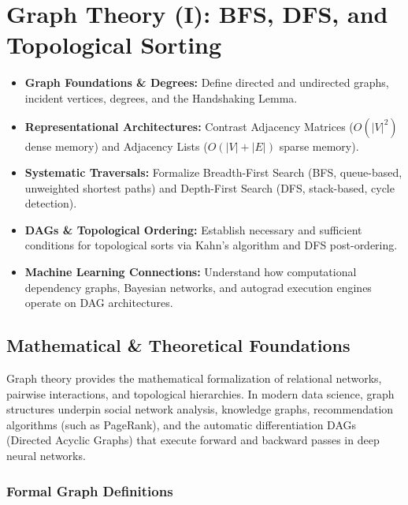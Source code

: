 \chapter{Graph Theory (I): BFS, DFS, and Topological Sorting}

\begin{tcolorbox}[colback=primarylight, colframe=primarydark, title={\textbf{Executive Roadmap \& Learning Objectives}}]
\begin{itemize}
    \item \textbf{Graph Foundations \& Degrees:} Define directed and undirected graphs, incident vertices, degrees, and the Handshaking Lemma.
    \item \textbf{Representational Architectures:} Contrast Adjacency Matrices ($O(|V|^2)$ dense memory) and Adjacency Lists ($O(|V| + |E|)$ sparse memory).
    \item \textbf{Systematic Traversals:} Formalize Breadth-First Search (BFS, queue-based, unweighted shortest paths) and Depth-First Search (DFS, stack-based, cycle detection).
    \item \textbf{DAGs \& Topological Ordering:} Establish necessary and sufficient conditions for topological sorts via Kahn's algorithm and DFS post-ordering.
    \item \textbf{Machine Learning Connections:} Understand how computational dependency graphs, Bayesian networks, and autograd execution engines operate on DAG architectures.
\end{itemize}
\end{tcolorbox}

\section{Mathematical \& Theoretical Foundations}

Graph theory provides the mathematical formalization of relational networks, pairwise interactions, and topological hierarchies. In modern data science, graph structures underpin social network analysis, knowledge graphs, recommendation algorithms (such as PageRank), and the automatic differentiation DAGs (Directed Acyclic Graphs) that execute forward and backward passes in deep neural networks.

\subsection{Formal Graph Definitions}

